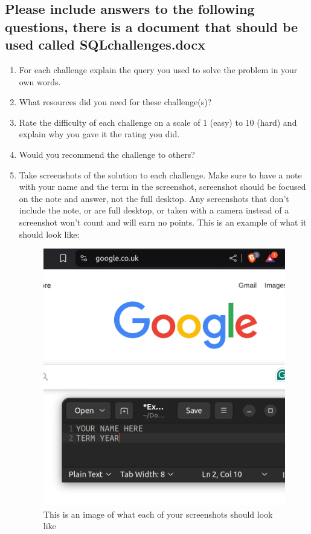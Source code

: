 \documentclass[12pt]{article}
\begin{document}
\subsection*{Please include answers to the following questions, there is a document that should be used called SQLchallenges.docx}
    \begin{enumerate}
        \item For each challenge explain the query you used to solve the problem in your own words.
        \item What resources did you need for these challenge(s)?
        \item Rate the difficulty of each challenge on a scale of 1 (easy) to 10 (hard) and explain why you gave it the rating you did.
        \item Would you recommend the challenge to others? 
        \item Take screenshots of the solution to each challenge. Make sure to have a note with your name and the term in the screenshot, screenshot should be focused on the note and answer, not the full desktop.  Any screenshots that don't include the note, or are full desktop, or taken with a camera instead of a screenshot won't count and will earn no points. This is an example of what it should look like:        
 
        \begin{figure}[h!]
            \centerline{\includegraphics[scale=.2]{ExampleScreenshot.png}}
            \caption{This is an image of what each of your screenshots should look like}

            \end{figure} 
    \end{enumerate}
\end{document}
